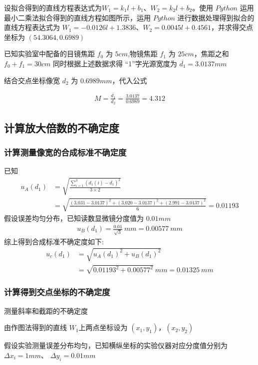 \documentclass[UTF8]{ctexart}
\begin{document}
设拟合得到的直线方程表达式为$W_1 = k_1l+b_1$、$W_2 = k_2l+b_2$。使用 $Python$ 运用最小二乘法拟合得到的直线方程如图所示，运用 $Python$ 进行数据处理得到拟合的直线方程表达式为 $W_1 = -0.0126l+1.3836$、$W_2 = 0.0045l+ 0.4561$，并求得交点坐标为 $(54.3064,0.6989)$

已知实验室中配备的目镜焦距 $f_0$ 为 $5cm$,物镜焦距 $f_1$ 为 $25cm$，焦距之和 $f_0 + f_1 =30 cm$
同时根据上述数据求得 “1”字光源宽度为 $\overline{d_1} = 3.0137 mm$

结合交点坐标像宽 $d_2$ 为 $0.6989 mm$，代入公式

\begin{align*}
    M = \frac{d_1}{d_2} = \frac{3.0137}{0.6989} = 4.312 
\end{align*}


\subsection{计算放大倍数的不确定度}
\subsubsection{计算测量像宽的合成标准不确定度}
已知 
\begin{align*}
    u_A(d_1) &= \sqrt{\frac{\sum_{i=1}^{3} (d_1(i) - \overline{d_1})^2}{3\times 2 }} \\
     &= \sqrt{\frac{
     (3.031 - 3.0137)^2  +   (3.020 - 3.0137)^2     +    (2.991 - 3.0137)^2
     }
     {6}
     } = 0.01193
\end{align*}
假设误差均匀分布，已知读数显微镜分度值为 $0.01mm$
\begin{align*}
    u_B(d_1) = \frac{0.01}{\sqrt{3}} \ mm  = 0.00577 \ mm
\end{align*}
综上得到合成标准不确定度如下:
\begin{align*}
    u_c(d_1) &= \sqrt{
    u_A(d_1)^2 + u_B(d_1)^2
    } \\
    &=  \sqrt{0.01193^{2}+0.00577^{2}}  \ mm = 0.01325 \ mm
\end{align*}

\subsubsection{计算得到交点坐标的不确定度}
测量斜率和截距的不确定度

由作图法得到的直线 $W_1$上两点坐标设为 $(x_1,y_1)$，$(x_2,y_2)$

假设实验测量误差分布均匀，已知横纵坐标的实验仪器对应分度值分别为 $\Delta x_i = 1 mm$、 $\Delta y_i = 0.01 mm$
\end{document}
